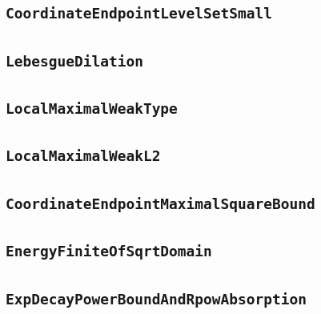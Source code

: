 \documentclass[11pt]{amsart}
\theoremstyle{definition}
\begin{document}
\subsection{\texorpdfstring{\texttt{CoordinateEndpointLevelSetSmall}}{CoordinateEndpointLevelSetSmall}}\label{node:CoordinateEndpointLevelSetSmall}


\subsection{\texorpdfstring{\texttt{LebesgueDilation}}{LebesgueDilation}}\label{node:LebesgueDilation}


\subsection{\texorpdfstring{\texttt{LocalMaximalWeakType}}{LocalMaximalWeakType}}\label{node:LocalMaximalWeakType}


\subsection{\texorpdfstring{\texttt{LocalMaximalWeakL2}}{LocalMaximalWeakL2}}\label{node:LocalMaximalWeakL2}


\subsection{\texorpdfstring{\texttt{CoordinateEndpointMaximalSquareBound}}{CoordinateEndpointMaximalSquareBound}}\label{node:CoordinateEndpointMaximalSquareBound}


\subsection{\texorpdfstring{\texttt{EnergyFiniteOfSqrtDomain}}{EnergyFiniteOfSqrtDomain}}\label{node:EnergyFiniteOfSqrtDomain}


\subsection{\texorpdfstring{\texttt{ExpDecayPowerBoundAndRpowAbsorption}}{ExpDecayPowerBoundAndRpowAbsorption}}\label{node:ExpDecayPowerBoundAndRpowAbsorption}

\end{document}
